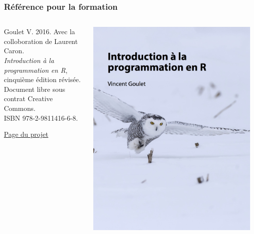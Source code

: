 \begin{frame}
  \frametitle{Référence pour la formation}

  \begin{columns}
    \begin{column}{.5\textwidth}
      Goulet V. 2016. Avec la colloboration de
      Laurent Caron. \\
      \emph{Introduction à la programmation en R},
      cinquième édition révisée. \\
      Document libre sous contrat Creative
      Commons. \\
      ISBN 978-2-9811416-6-8.
      \bigskip

      \href{https://vigou3.github.io/introduction-programmation-r}{%
        Page du projet}
    \end{column}
    \begin{column}{.4\textwidth}
      \includegraphics[width=\linewidth,frame]{introduction-programmation-r}
    \end{column}
  \end{columns}
\end{frame}

